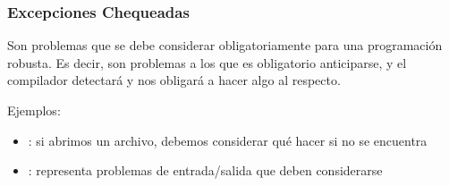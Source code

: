 \documentclass{beamer}
\begin{document}
\begin{frame}
  \frametitle{Excepciones Chequeadas}
    
  \begin{block}{}
    Son problemas que se debe considerar obligatoriamente para una
    programación robusta. Es decir, son problemas a los que es
    obligatorio anticiparse, y el compilador detectará y nos obligará
    a hacer algo al respecto.
  \end{block}

  \begin{block}{}
    Ejemplos:

    \begin{itemize}
    \item {}: si abrimos un
      archivo, debemos considerar qué hacer si no se encuentra
    \item {}: representa problemas de
      entrada/salida que deben considerarse
    \end{itemize}
  \end{block}

\end{frame}
\end{document}

